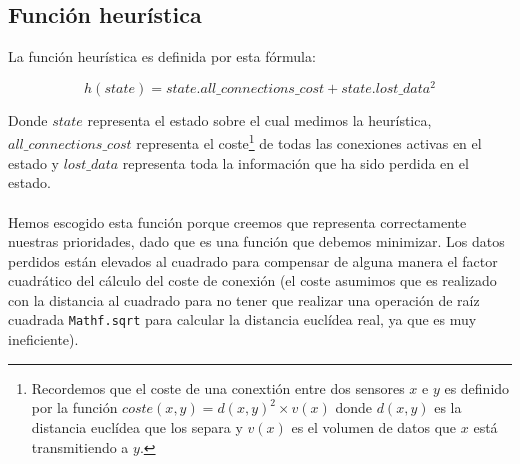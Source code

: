 \subsection{Función heurística}

La función heurística es definida por esta fórmula:


\[ h(state) = state.all\_connections\_cost + state.lost\_data^2 \]

Donde $state$ representa el estado sobre el cual medimos la heurística,
$all\_connections\_cost$ representa el coste\footnote{
  Recordemos que el coste de una conextión entre dos sensores
  $x$ e $y$ es definido por la función 
  $coste(x, y) = d(x, y)^2 \times v(x)$ donde $d(x,y)$ es la distancia 
  euclídea que los separa
  y $v(x)$ es el volumen de datos que $x$ está transmitiendo a $y$.
}
de todas las conexiones activas en el estado y $lost\_data$ representa toda
la información que ha sido perdida en el estado.

\paragraph{}

Hemos escogido esta función porque creemos que representa correctamente
nuestras prioridades, dado que es una función que debemos minimizar.
Los datos perdidos están elevados al cuadrado
para compensar de alguna manera el factor cuadrático del cálculo del coste
de conexión (el coste asumimos que es realizado con la distancia al cuadrado
para no tener que realizar una operación de raíz cuadrada 
\texttt{Mathf.sqrt} para calcular la distancia euclídea real, ya que es muy
ineficiente).
